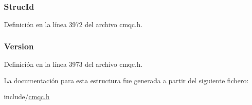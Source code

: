 \hypertarget{structtag_m_q_c_m_h_o_a0530922ca944569b52601d74941f96e4}{}
\subsubsection[{Struc\+Id}]{ Struc\+Id}\label{structtag_m_q_c_m_h_o_a0530922ca944569b52601d74941f96e4}


Definición en la línea 3972 del archivo cmqc.\+h.

\hypertarget{structtag_m_q_c_m_h_o_a0656ef8f766b3907d394d88a35d7b7e9}{}
\subsubsection[{Version}]{ Version}\label{structtag_m_q_c_m_h_o_a0656ef8f766b3907d394d88a35d7b7e9}


Definición en la línea 3973 del archivo cmqc.\+h.



La documentación para esta estructura fue generada a partir del siguiente fichero\+:\begin{DoxyCompactItemize}
\item 
include/\hyperlink{cmqc_8h}{cmqc.\+h}\end{DoxyCompactItemize}
